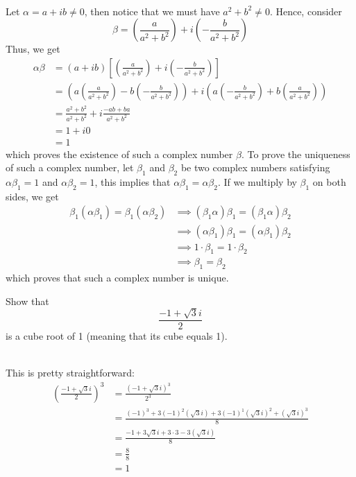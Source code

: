 \begin{solution}
    \\ Let $\alpha = a + ib \neq 0$, then notice that we must have $a^2 + b^2 \neq 0$. Hence, consider 
    $$\beta = \left(\frac{a}{a^2 + b^2}\right) + i\left(-\frac{b}{a^2 + b^2}\right)$$
    Thus, we get
    \begin{align*}
        \alpha \beta &= (a + ib) \left[\left(\frac{a}{a^2 + b^2}\right) + i\left(-\frac{b}{a^2 + b^2}\right)\right]\\
        &= \left(a\left(\frac{a}{a^2 + b^2}\right) - b\left(-\frac{b}{a^2 + b^2}\right)\right) + i\left(a\left(-\frac{b}{a^2 + b^2}\right) + b\left(\frac{a}{a^2 + b^2}\right)\right) \\
        &= \frac{a^2 + b^2}{a^2 + b^2} + i\frac{-ab + ba}{a^2 + b^2} \\
        &= 1 + i0 \\
        &= 1
    \end{align*}
    which proves the existence of such a complex number $\beta$. To prove the uniqueness of such a complex number, let $\beta_1$ and $\beta_2$ be two complex numbers satisfying $\alpha\beta_1 = 1$ and $\alpha \beta_2 = 1$, this implies that $\alpha \beta_1 = \alpha \beta_2$. If we multiply by $\beta_1$ on both sides, we get
    \begin{align*}
        \beta_1 (\alpha \beta_1) = \beta_1 (\alpha \beta_2) &\implies (\beta_1 \alpha) \beta_1 = (\beta_1 \alpha) \beta_2 \\
        &\implies (\alpha  \beta_1)  \beta_1 = (\alpha  \beta_1)  \beta_2 \\
        &\implies 1 \cdot \beta_1 = 1 \cdot \beta_2 \\
        &\implies \beta_1 = \beta_2
    \end{align*}
    which proves that such a complex number is unique.\\
\end{solution}

\begin{exercise}
    Show that
    $$\frac{-1 + \sqrt{3}i}{2}$$
    is a cube root of 1 (meaning that its cube equals 1). \\
\end{exercise}

\begin{solution}
    \\This is pretty straightforward:
    \begin{align*}
        \left(\frac{-1 + \sqrt{3}i}{2}\right)^3 &= \frac{(-1 + \sqrt{3}i)^3}{2^3} \\
        &= \frac{(-1)^3 + 3(-1)^2(\sqrt{3}i) + 3(-1)^1(\sqrt{3}i)^2 + (\sqrt{3}i)^3}{8} \\
        &= \frac{-1 + 3\sqrt{3}i + 3\cdot 3 - 3(\sqrt{3}i)}{8} \\
        &= \frac{8}{8} \\
        &= 1\\
    \end{align*}
\end{solution}

